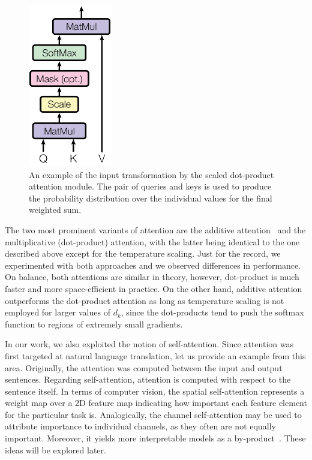 \begin{figure}[!t]
    \centerline{\includegraphics[width=0.15\linewidth]{figures/siamese_tracking/scaled_dot_product_attention.pdf}}
    \caption[Scaled dot-product attention]{An example of the input transformation by the scaled dot-product attention module. The pair of queries and keys is used to produce the probability distribution over the individual values for the final weighted sum. }
    \label{fig:ScaledDotProductAttention}
\end{figure}

The two most prominent variants of attention are the additive attention~\cite{bahdanau2016additiveattention} and the multiplicative (dot-product) attention, with the latter being identical to the one described above except for the temperature scaling. Just for the record, we experimented with both approaches and we observed differences in performance. On balance, both attentions are similar in theory, however, dot-product is much faster and more space-efficient in practice. On the other hand, additive attention outperforms the dot-product attention as long as temperature scaling is not employed for larger values of $d_k$, since the dot-products tend to push the softmax function to regions of extremely small gradients.

In our work, we also exploited the notion of self-attention. Since attention was first targeted at natural language translation, let us provide an example from this area. Originally, the attention was computed between the input and output sentences. Regarding self-attention, attention is computed with respect to the sentence itself. In terms of computer vision, the spatial self-attention represents a weight map over a $2$D feature map indicating how important each feature element for the particular task is. Analogically, the channel self-attention may be used to attribute importance to individual channels, as they often are not equally important. Moreover, it yields more interpretable models as a by-product~\cite{vaswani2017attention}. These ideas will be explored later.

